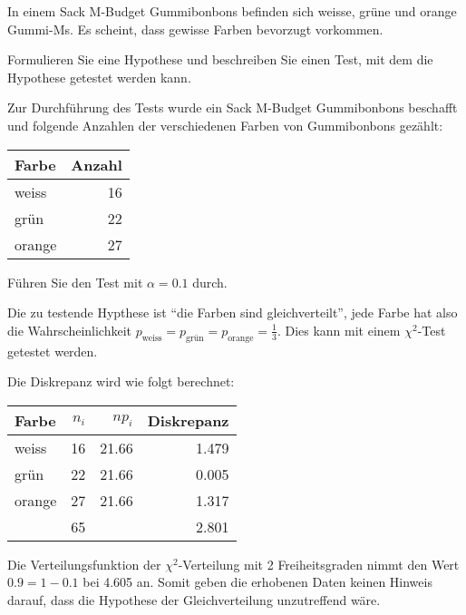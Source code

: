 In einem Sack M-Budget Gummibonbons befinden sich weisse, grüne und orange
Gummi-Ms. Es scheint, dass gewisse Farben bevorzugt vorkommen.
\begin{teilaufgaben}
\item Formulieren Sie eine Hypothese und beschreiben Sie einen Test, mit
dem die Hypothese getestet werden kann.
\item Zur Durchführung des Tests wurde ein Sack M-Budget Gummibonbons
beschafft und folgende Anzahlen der verschiedenen Farben von Gummibonbons
gezählt:
\begin{center}
\begin{tabular}{lr}
Farbe&Anzahl\\
\hline
weiss&16\\
grün&22\\
orange&27
\end{tabular}
\end{center}
Führen Sie den Test mit $\alpha = 0.1$ durch.
\end{teilaufgaben}

\begin{loesung}
\begin{teilaufgaben}
\item Die zu testende Hypthese ist ``die Farben sind gleichverteilt'', jede Farbe
hat also die Wahrscheinlichkeit
$p_{\text{weiss}}=p_{\text{grün}}=p_{\text{orange}}=\frac13$. Dies kann
mit einem $\chi^2$-Test getestet werden.
\item Die Diskrepanz wird wie folgt berechnet:
\begin{center}
\begin{tabular}{lrrr}
Farbe&$n_i$&$np_i$&Diskrepanz\\
\hline
weiss&16&21.66&1.479\\
grün&22&21.66&0.005\\
orange&27&21.66&1.317\\
\hline
&65&&2.801
\end{tabular}
\end{center}
Die Verteilungsfunktion der $\chi^2$-Verteilung mit 2 Freiheitsgraden nimmt
den Wert $0.9=1-0.1$ bei 4.605 an. Somit geben die erhobenen Daten keinen
Hinweis darauf, dass die Hypothese der Gleichverteilung unzutreffend wäre.
\qedhere
\end{teilaufgaben}
\end{loesung}

